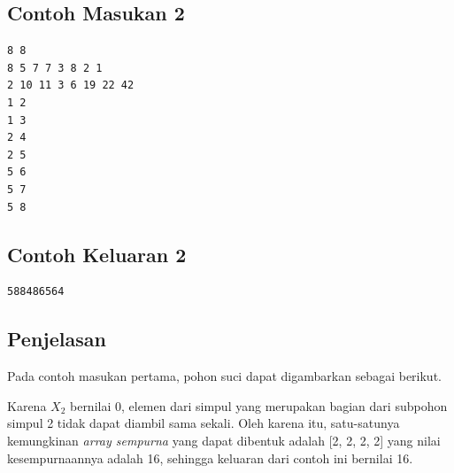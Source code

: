 \documentclass{article}
\begin{document}
\begin{multicols}{2}
\subsection*{Contoh Masukan 2}
\begin{lstlisting}
8 8
8 5 7 7 3 8 2 1
2 10 11 3 6 19 22 42
1 2
1 3
2 4
2 5
5 6
5 7
5 8

\end{lstlisting}
\columnbreak
\subsection*{Contoh Keluaran 2}
\begin{lstlisting}
588486564
\end{lstlisting}
\end{multicols}

\subsection*{Penjelasan}
Pada contoh masukan pertama, pohon suci dapat digambarkan sebagai berikut.
\begin{center}
\end{center}

Karena $X_{2}$ bernilai 0, elemen dari simpul yang merupakan bagian dari subpohon simpul 2 tidak dapat diambil sama sekali. Oleh karena itu, satu-satunya kemungkinan \textit{array sempurna} yang dapat dibentuk adalah [2, 2, 2, 2] yang nilai kesempurnaannya adalah 16, sehingga keluaran dari contoh ini bernilai 16.

\pagebreak
\end{document}
